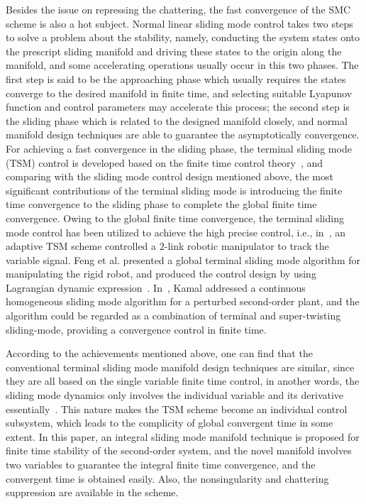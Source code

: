 \documentclass[3p]{elsarticle}
\theoremstyle{plain}
\theoremstyle{remark}
\begin{document}
Besides the issue on repressing the chattering, the fast convergence of the SMC scheme is also a hot subject. Normal linear sliding mode control takes two steps to solve a problem about the stability, namely, conducting the system states onto the prescript sliding manifold and driving these states to the origin along the manifold, and some accelerating operations usually occur in this two phases. The first step is said to be the approaching phase which usually requires the states converge to the desired manifold in finite time, and selecting suitable Lyapunov function and control parameters may accelerate this process; the second step is the sliding phase which is related to the designed manifold closely, and normal manifold design techniques are able to guarantee the asymptotically convergence. For achieving a fast convergence in the sliding phase, the terminal sliding mode (TSM) control is developed based on the finite time control theory~\cite{haimo1986finite,bhat1997finite}, and comparing with the sliding mode control design mentioned above, the most significant contributions of the terminal sliding mode is introducing the finite time convergence to the sliding phase to complete the global finite time convergence. Owing to the global finite time convergence, the terminal sliding mode control has been utilized to achieve the high precise control, i.e., in~\cite{li2015robust}, an adaptive TSM scheme controlled a $2$-link robotic manipulator to track the variable signal. Feng et al. presented a global terminal sliding mode algorithm for manipulating the rigid robot, and produced the control design by using Lagrangian dynamic expression~\cite{feng2002non}. In~\cite{kamal2016continuous}, Kamal addressed a continuous homogeneous sliding mode algorithm for a perturbed second-order plant, and the algorithm could be regarded as a combination of terminal and super-twisting sliding-mode, providing a convergence control in finite time. \par
According to the achievements mentioned above, one can find that the conventional terminal sliding mode manifold design techniques are similar, since they are all based on the single variable finite time control, in another words, the sliding mode dynamics only involves the individual variable and its derivative essentially~\cite{mu2016switching}. This nature makes the TSM scheme become an individual control subsystem, which leads to the complicity of global convergent time in some extent. In this paper, an integral sliding mode manifold technique is proposed for finite time stability of the second-order system, and the novel manifold involves two variables to guarantee the integral finite time convergence, and the convergent time is obtained easily. Also, the nonsingularity and chattering suppression are available in the scheme. \par
\end{document}
